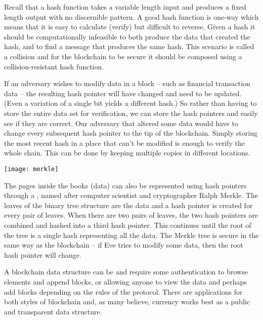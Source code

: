 Recall that a hash function takes a variable length input and produces a fixed length output with no discernible pattern. A good hash function is one-way which means that it is easy to calculate (verify) but difficult to reverse. Given a hash it should be computationally infeasible to both produce the data that created the hash, and to find a message that produces the same hash. This scenario is called a collision and for the blockchain to be secure it should be composed using a collision-resistant hash function.

If an adversary wishes to modify data in a block -- such as financial transaction data -- the resulting hash pointer will have changed and need to be updated. (Even a variation of a single bit yields a different hash.) So rather than having to store the entire data set for verification, we can store the hash pointers and easily see if they are correct. Our adversary that altered some data would have to change every subsequent hash pointer to the tip of the blockchain. Simply storing the most recent hash in a place that can't be modified is enough to verify the whole chain. This can be done by keeping multiple copies in different locations. 

\begin{center}
	\texttt{[image: merkle]}
\end{center}

The pages inside the books (data) can also be represented using hash pointers through a , named after computer scientist and cryptographer Ralph Merkle. The leaves of the binary tree structure are the data and a hash pointer is created for every pair of leaves. When there are two pairs of leaves, the two hash pointers are combined and hashed into a third hash pointer. This continues until the root of the tree is a single hash representing all the data. The Merkle tree is secure in the same way as the blockchain -- if Eve tries to modify some data, then the root hash pointer will change. 

A blockchain data structure can be  and require some authentication to browse elements and append blocks, or  allowing anyone to view the data and perhaps add blocks depending on the rules of the protocol. There are applications for both styles of blockchain and, as many believe, currency works best as a public and transparent data structure.

